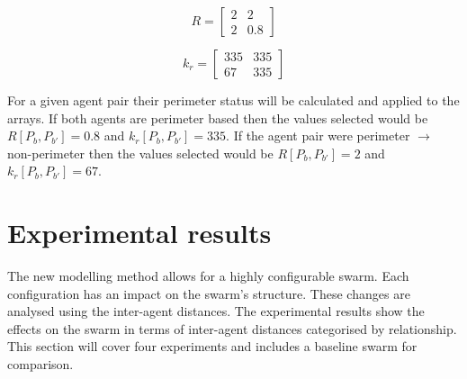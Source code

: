 \documentclass[12pt,a4paper]{IEEEtran}
\newcommand{\kr}{\mathit{k_{r}}}
\newcommand{\rb}{\mathit{R}}
\begin{document}
\begin{equation}\label{eq:rexample1}
	\rb = 
	\begin{bmatrix}
	2 & 2\\
	2 & 0.8
	\end{bmatrix}
\end{equation}

\begin{equation}\label{eq:krexample1}
	\kr = 
	\begin{bmatrix}
	335 & 335\\
	67 & 335
	\end{bmatrix}
\end{equation}

For a given agent pair their perimeter status will be calculated and applied to the arrays. If both agents are perimeter based then the values selected would be $\rb[P_b,P_{b'}] = 0.8$ and $\kr[P_b,P_{b'}] = 335$. If the agent pair were perimeter $\rightarrow$ non-perimeter then the values selected would be $\rb[P_b,P_{b'}] = 2$ and $\kr[P_b,P_{b'}] = 67$.\\

\section{Experimental results\label{sec:ExperimentalResults}}
The new modelling method allows for a highly configurable swarm. Each configuration has an impact on the swarm's structure. These changes are analysed using the inter-agent distances. The experimental results show the effects on the swarm in terms of inter-agent distances categorised by relationship. This section will cover four experiments and includes a baseline swarm for comparison.
\end{document}
